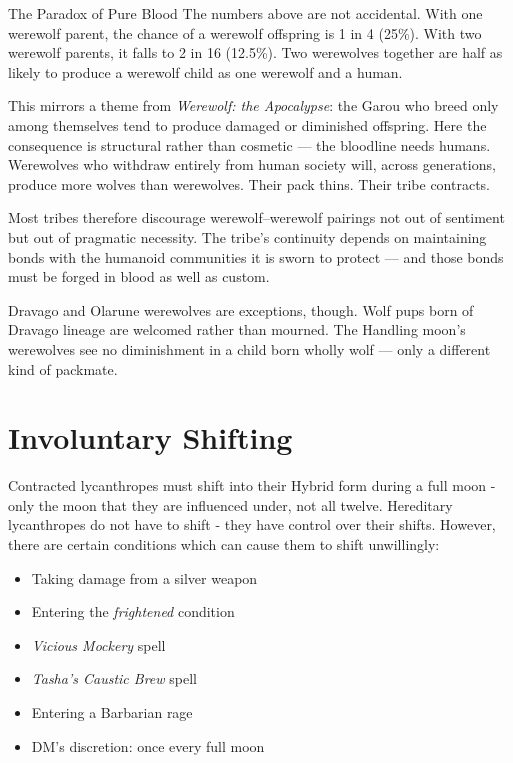 \documentclass[twocolumn]{dndbook}
\begin{document}
\begin{DndSidebar}[float=!b]{The Paradox of Pure Blood}
    The numbers above are not accidental.
    With one werewolf parent, the chance of a werewolf offspring is 1 in 4 (25\%).
    With two werewolf parents, it falls to 2 in 16 (12.5\%).
    Two werewolves together are half as likely to produce a werewolf child as one werewolf and a human.

    This mirrors a theme from \emph{Werewolf: the Apocalypse}: the Garou who breed only among themselves tend to produce damaged or diminished offspring.
    Here the consequence is structural rather than cosmetic --- the bloodline needs humans.
    Werewolves who withdraw entirely from human society will, across generations, produce more wolves than werewolves.
    Their pack thins.
    Their tribe contracts.

    Most tribes therefore discourage werewolf--werewolf pairings not out of sentiment but out of pragmatic necessity.
    The tribe's continuity depends on maintaining bonds with the humanoid communities it is sworn to protect --- and those bonds must be forged in blood as well as custom.

    Dravago and Olarune werewolves are exceptions, though.
    Wolf pups born of Dravago lineage are welcomed rather than mourned.
    The Handling moon's werewolves see no diminishment in a child born wholly wolf --- only a different kind of packmate.
\end{DndSidebar}

\section*{Involuntary Shifting}\label{sec:involuntary-shifting}
Contracted lycanthropes must shift into their Hybrid form during a full moon - only the moon that they are influenced under, not all twelve.
Hereditary lycanthropes do not have to shift - they have control over their shifts.
However, there are certain conditions which can cause them to shift unwillingly:
\begin{itemize}
    \item Taking damage from a silver weapon
    \item Entering the \emph{frightened} condition
    \item \emph{Vicious Mockery} spell
    \item \emph{Tasha's Caustic Brew} spell
    \item Entering a Barbarian rage
    \item DM's discretion: once every full moon
\end{itemize}
\end{document}
